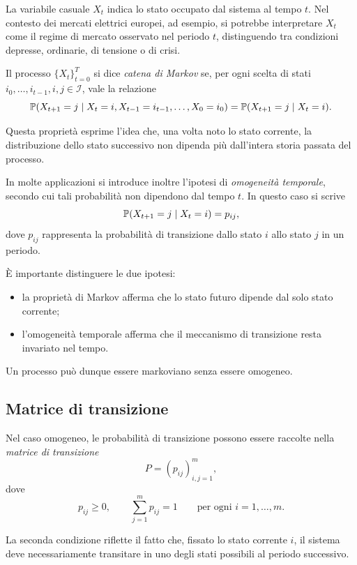 La variabile casuale \(X_t\) indica lo stato occupato dal sistema al
tempo \(t\). Nel contesto dei mercati elettrici europei, ad esempio, si
potrebbe interpretare \(X_t\) come il regime di mercato osservato nel
periodo \(t\), distinguendo tra condizioni depresse, ordinarie, di
tensione o di crisi.

Il processo \(\{X_t\}_{t=0}^{T}\) si dice \emph{catena di Markov} se,
per ogni scelta di stati \(i_0,\ldots,i_{t-1},i,j\in\mathcal{I}\), vale
la relazione
\[
\mathbb{P}(X_{t+1}=j \mid X_t=i, X_{t-1}=i_{t-1}, \ldots, X_0=i_0)
=
\mathbb{P}(X_{t+1}=j \mid X_t=i).
\]

Questa propriet\`{a} esprime l'idea che, una volta noto lo stato
corrente, la distribuzione dello stato successivo non dipenda pi\`{u}
dall'intera storia passata del processo.

In molte applicazioni si introduce inoltre l'ipotesi di
\emph{omogeneit\`{a} temporale}, secondo cui tali probabilit\`{a} non
dipendono dal tempo \(t\). In questo caso si scrive
\[
\mathbb{P}(X_{t+1}=j \mid X_t=i)=p_{ij},
\]
dove \(p_{ij}\) rappresenta la probabilit\`{a} di transizione dallo
stato \(i\) allo stato \(j\) in un periodo.

\`{E} importante distinguere le due ipotesi:

\begin{itemize}

\item la propriet\`{a} di Markov afferma che lo stato futuro dipende dal
solo stato corrente;

\item l'omogeneit\`{a} temporale afferma che il meccanismo di transizione
resta invariato nel tempo.

\end{itemize}

Un processo pu\`{o} dunque essere markoviano senza essere omogeneo.

\subsection{Matrice di transizione}

Nel caso omogeneo, le probabilit\`{a} di transizione possono essere
raccolte nella \emph{matrice di transizione}
\[
P=(p_{ij})_{i,j=1}^{m},
\]
dove
\[
p_{ij}\geq 0,
\qquad
\sum_{j=1}^{m} p_{ij}=1
\qquad
\text{per ogni } i=1,\ldots,m.
\]

La seconda condizione riflette il fatto che, fissato lo stato corrente
\(i\), il sistema deve necessariamente transitare in uno degli stati
possibili al periodo successivo.

